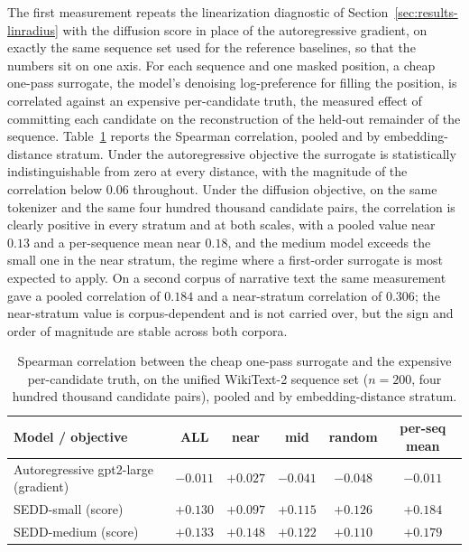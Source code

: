 The first measurement repeats the linearization diagnostic of Section~\ref{sec:results-linradius} with the diffusion score in place of the autoregressive gradient, on exactly the same sequence set used for the reference baselines, so that the numbers sit on one axis. For each sequence and one masked position, a cheap one-pass surrogate, the model's denoising log-preference for filling the position, is correlated against an expensive per-candidate truth, the measured effect of committing each candidate on the reconstruction of the held-out remainder of the sequence. Table~\ref{tab:diffusion-lin} reports the Spearman correlation, pooled and by embedding-distance stratum. Under the autoregressive objective the surrogate is statistically indistinguishable from zero at every distance, with the magnitude of the correlation below $0.06$ throughout. Under the diffusion objective, on the same tokenizer and the same four hundred thousand candidate pairs, the correlation is clearly positive in every stratum and at both scales, with a pooled value near $0.13$ and a per-sequence mean near $0.18$, and the medium model exceeds the small one in the near stratum, the regime where a first-order surrogate is most expected to apply. On a second corpus of narrative text the same measurement gave a pooled correlation of $0.184$ and a near-stratum correlation of $0.306$; the near-stratum value is corpus-dependent and is not carried over, but the sign and order of magnitude are stable across both corpora. %

\begin{table}[h]
    \centering
    \small
    \setlength{\tabcolsep}{4pt}
    \begin{tabular}{lccccc}
        \toprule
        Model / objective & ALL & near & mid & random & per-seq mean \\
        \midrule
        Autoregressive gpt2-large (gradient) & $-0.011$ & $+0.027$ & $-0.041$ & $-0.048$ & $-0.011$ \\
        SEDD-small (score) & $+0.130$ & $+0.097$ & $+0.115$ & $+0.126$ & $+0.184$ \\
        SEDD-medium (score) & $+0.133$ & $+0.148$ & $+0.122$ & $+0.110$ & $+0.179$ \\
        \bottomrule
    \end{tabular}
    \caption[Linearization correlation, autoregressive gradient against diffusion score.]{Spearman correlation between the cheap one-pass surrogate and the expensive per-candidate truth, on the unified WikiText-2 sequence set ($n=200$, four hundred thousand candidate pairs), pooled and by embedding-distance stratum.}
    \label{tab:diffusion-lin}
\end{table}

